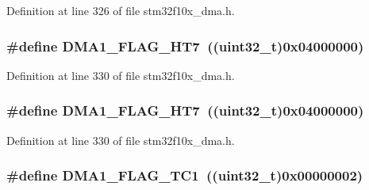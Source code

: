 Definition at line 326 of file stm32f10x\+\_\+dma.\+h.

\subsubsection[{\texorpdfstring{D\+M\+A1\+\_\+\+F\+L\+A\+G\+\_\+\+H\+T7}{DMA1_FLAG_HT7}}]{\setlength{\rightskip}{0pt plus 5cm}\#define D\+M\+A1\+\_\+\+F\+L\+A\+G\+\_\+\+H\+T7~(({\bf uint32\+\_\+t})0x04000000)}\hypertarget{group___d_m_a__flags__definition_ga1a7cbf9dffa4fc5ef1cedb46ea446387}{}\label{group___d_m_a__flags__definition_ga1a7cbf9dffa4fc5ef1cedb46ea446387}


Definition at line 330 of file stm32f10x\+\_\+dma.\+h.

\subsubsection[{\texorpdfstring{D\+M\+A1\+\_\+\+F\+L\+A\+G\+\_\+\+H\+T7}{DMA1_FLAG_HT7}}]{\setlength{\rightskip}{0pt plus 5cm}\#define D\+M\+A1\+\_\+\+F\+L\+A\+G\+\_\+\+H\+T7~(({\bf uint32\+\_\+t})0x04000000)}\hypertarget{group___d_m_a__flags__definition_ga1a7cbf9dffa4fc5ef1cedb46ea446387}{}\label{group___d_m_a__flags__definition_ga1a7cbf9dffa4fc5ef1cedb46ea446387}


Definition at line 330 of file stm32f10x\+\_\+dma.\+h.

\subsubsection[{\texorpdfstring{D\+M\+A1\+\_\+\+F\+L\+A\+G\+\_\+\+T\+C1}{DMA1_FLAG_TC1}}]{\setlength{\rightskip}{0pt plus 5cm}\#define D\+M\+A1\+\_\+\+F\+L\+A\+G\+\_\+\+T\+C1~(({\bf uint32\+\_\+t})0x00000002)}\hypertarget{group___d_m_a__flags__definition_gaa9b4d1112bcfd34136007b813a11187e}{}\label{group___d_m_a__flags__definition_gaa9b4d1112bcfd34136007b813a11187e}


